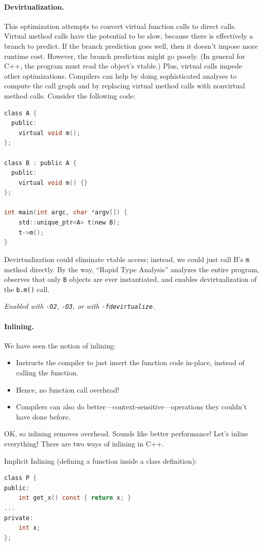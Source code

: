 \documentclass[a4paper]{report}
\begin{document}
\paragraph{Devirtualization.} This optimization attempts to convert
virtual function calls to direct calls.  Virtual method calls have the
potential to be slow, because there is effectively a branch to
predict. If the branch prediction goes well, then it doesn't impose
more runtime cost. However, the branch prediction might go poorly.  (In
general for C++, the program must read the object's vtable.) Plus, virtual
calls impede other optimizations. Compilers can help by doing
sophisticated analyses to compute the call graph and by replacing
virtual method calls with nonvirtual method calls.  Consider the
following code:
  \begin{lstlisting}[language=C]
class A {
  public:
    virtual void m();
};

class B : public A {
  public:
    virtual void m() {}
};

int main(int argc, char *argv[]) {
    std::unique_ptr<A> t(new B);
    t->m();
}
  \end{lstlisting}
Devirtualization could eliminate vtable access; instead, we could just call B's {\tt m} method
directly. By the way, ``Rapid Type Analysis'' analyzes the entire program, observes that
only {\tt B} objects are ever instantiated, and enables devirtualization
of the {\tt b.m()} call.

\noindent \emph{Enabled with {\tt -O2}, {\tt -O3}, or with {\tt -fdevirtualize}.}

\paragraph{Inlining.} We have seen the notion of inlining:
  \begin{itemize}
    \item Instructs the compiler to just insert the function code in-place,
      instead of calling the function.
    \item Hence, no function call overhead!
    \item Compilers can also do better---context-sensitive---operations they couldn't
      have done before.
  \end{itemize}

OK, so inlining removes overhead. Sounds like better performance! Let's inline everything!
There are two ways of inlining in C++.

Implicit Inlining (defining a function inside a class definition):
  \begin{lstlisting}[language=C]
class P {
public:
    int get_x() const { return x; }
...
private:
    int x;
};
  \end{lstlisting}
\end{document}

